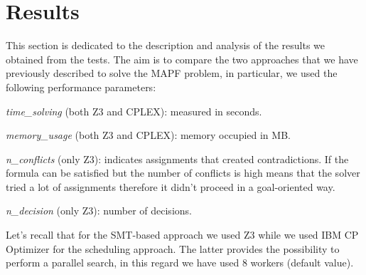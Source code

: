 \documentclass[12pt, a4paper, hidelinks]{article}
\numberwithin{equation}{section}
\begin{document}
\section{Results}\label{sec:results}
This section is dedicated to the description and analysis of the results we obtained from the tests.
The aim is to compare the two approaches that we have previously described to solve the MAPF problem,
in particular, we used the following performance parameters:

\begin{description}
    \item \textit{time\_solving} (both Z3 and CPLEX): measured in seconds.
    \item \textit{memory\_usage} (both Z3 and CPLEX): memory occupied in MB\@.
    \item \textit{n\_conflicts} (only Z3): indicates assignments that created contradictions.
If the formula can be satisfied but the number of conflicts is high means that the solver tried a lot of assignments therefore it didn't proceed in a goal-oriented way.
    \item \textit{n\_decision} (only Z3): number of decisions.
\end{description}

Let's recall that for the SMT-based approach we used Z3 while we used IBM CP Optimizer for the scheduling approach.
The latter provides the possibility to perform a parallel search, in this regard we have used 8 workers (default value).
\end{document}
